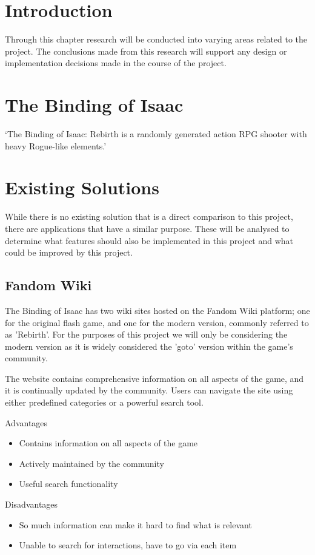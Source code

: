 \section{Introduction}
Through this chapter research will be conducted into varying areas related to the project. The conclusions made from 
this research will support any design or implementation decisions made in the course of the project.
\section{The Binding of Isaac}
`The Binding of Isaac: Rebirth is a randomly generated action RPG shooter with heavy Rogue-like elements.'\cite*{BindingIsaacRebirtha}
\section{Existing Solutions}
While there is no existing solution that is a direct comparison to this project, there are applications that have a 
similar purpose. These will be analysed to determine what features should also be implemented in this project and what 
could be improved by this project.
\subsection*{Fandom Wiki}
The Binding of Isaac has two wiki sites hosted on the Fandom Wiki platform; one for the original flash 
game\cite{BindingIsaacWiki}, and one for the modern version, commonly referred to as 'Rebirth'\cite{BindingIsaacRebirth}.
For the purposes of this project we will only be considering the modern version as it is widely considered the 'goto' 
version within the game's community.\par The website contains comprehensive information on all aspects of the game, 
and it is continually updated by the community. Users can navigate the site using either predefined categories or a 
powerful search tool. \par
Advantages
\begin{itemize}
    \item Contains information on all aspects of the game
    \item Actively maintained by the community
    \item Useful search functionality
\end{itemize}
Disadvantages
\begin{itemize}
    \item So much information can make it hard to find what is relevant
    \item Unable to search for interactions, have to go via each item 
\end{itemize}
